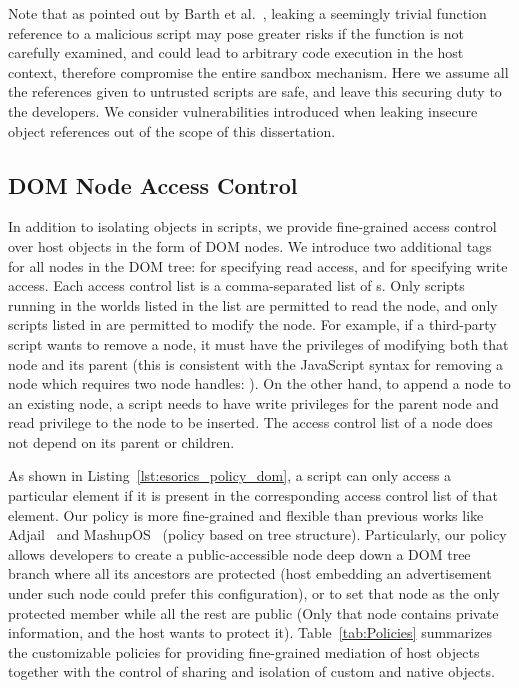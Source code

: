 Note that as pointed out by Barth et al.~\cite{Finifter_preventingcapability,COL}, leaking a seemingly trivial function reference to a malicious script may pose greater risks if the function is not carefully examined, and could lead to arbitrary code execution in the host context, therefore compromise the entire sandbox mechanism.  Here we assume all the references given to untrusted scripts are safe, and leave this securing duty to the developers.  We consider vulnerabilities introduced when leaking insecure object references out of the scope of this dissertation.

\subsection{DOM Node Access Control} 
\label{sec:esorics_policy_dom}

\lstset{xleftmargin=.2\textwidth,xrightmargin=.2\textwidth}


In addition to isolating objects in scripts, we provide fine-grained access control over host objects in the form of DOM nodes.   We introduce two additional tags for all nodes in the DOM tree:  for specifying read access, and  for specifying write access.  Each access control list is a comma-separated list of s.  Only scripts running in the worlds listed in the  list are permitted to read the node, and only scripts listed in  are permitted to modify the node.  For example, if a third-party script wants to remove a node, it must have the privileges of modifying both that node and its parent (this is consistent with the JavaScript syntax for removing a node which requires two node handles: ).  On the other hand, to append a node to an existing node, a script needs to have write privileges for the parent node and read privilege to the node to be inserted.  The access control list of a node does not depend on its parent or children.  

As shown in Listing~\ref{lst:esorics_policy_dom}, a script can only access a particular  element if it is present in the corresponding access control list of that element.  Our policy is more fine-grained and flexible than previous works like Adjail~\cite{Adjail} and MashupOS~\cite{MashupOS} (policy based on tree structure).  Particularly, our policy allows developers to create a public-accessible node deep down a DOM tree branch where all its ancestors are protected (host embedding an advertisement under such node could prefer this configuration), or to set that node as the only protected member while all the rest are public (Only that node contains private information, and the host wants to protect it).  Table~\ref{tab:Policies} summarizes the customizable policies for providing fine-grained mediation of host objects together with the control of sharing and isolation of custom and native objects.

